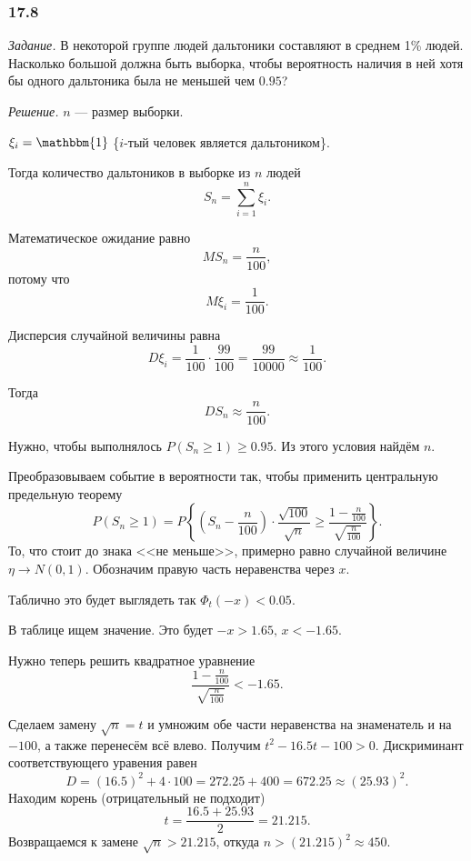 \subsubsection*{17.8}

\textit{Задание.} В некоторой группе людей дальтоники составляют в среднем 1\% людей.
Насколько большой должна быть выборка,
чтобы вероятность наличия в ней хотя бы одного дальтоника была не меньшей чем $0.95$?

\textit{Решение.} $n$ --- размер выборки.

$ \xi_i = \mathbbm{1}$ \{$i$-тый человек является дальтоником\}.

Тогда количество дальтоников в выборке из $n$ людей
$$S_n =
  \sum \limits_{i = 1}^n \xi_i.$$

Математическое ожидание равно
$$MS_n =
  \frac{n}{100},$$
потому что
$$M \xi_i =
  \frac{1}{100}.$$

Дисперсия случайной величины равна
$$D \xi_i =
  \frac{1}{100} \cdot \frac{99}{100} =
  \frac{99}{10000} \approx
  \frac{1}{100}.$$

Тогда
$$DS_n \approx
  \frac{n}{100}.$$

Нужно, чтобы выполнялось $P \left( S_n \geq 1 \right) \geq 0.95$.
Из этого условия найдём $n$.

Преобразовываем событие в вероятности так, чтобы применить центральную предельную теорему
$$P \left( S_n \geq 1 \right) =
  P \left\{
    \left( S_n - \frac{n}{100} \right) \cdot \frac{ \sqrt{100}}{\sqrt{n}} \geq
    \frac{1 - \frac{n}{100}}{ \sqrt{ \frac{n}{100}}}
  \right\}.$$
То, что стоит до знака <<не меньше>>, примерно равно случайной величине
$ \eta \to N \left( 0, 1 \right) $.
Обозначим правую часть неравенства через $x$.

Таблично это будет выглядеть так $ \Phi_t \left( -x \right) < 0.05$.

В таблице ищем значение.
Это будет $-x > 1.65, \, x < -1.65$.

Нужно теперь решить квадратное уравнение
$$ \frac{1 - \frac{n}{100}}{ \sqrt{ \frac{n}{100}}} < -1.65.$$

Сделаем замену $ \sqrt{n} = t$ и умножим обе части неравенства на знаменатель и на $-100$,
а также перенесём всё влево.
Получим $t^2 - 16.5t - 100 > 0$.
Дискриминант соответствующего уравения равен
$$D =
  \left( 16.5 \right)^2 + 4 \cdot 100 =
  272.25 + 400 =
  672.25 \approx
  \left( 25.93 \right)^2.$$
Находим корень (отрицательный не подходит)
$$t =
  \frac{16.5 + 25.93}{2} =
  21.215.$$
Возвращаемся к замене $ \sqrt{n} > 21.215$, откуда $n >  \left( 21.215 \right)^2 \approx 450$.

